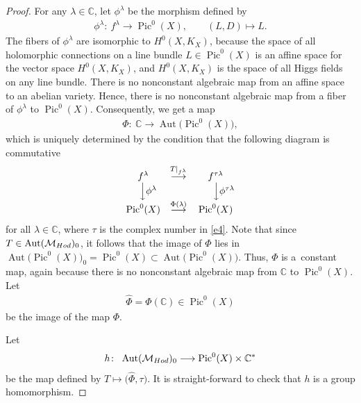 \documentclass[11pt]{article}
\numberwithin{equation}{section}
\begin{document}
\begin{proof}
For any $\lambda \in \mathbb C$, let $\phi^\lambda$ be the morphism def\/ined by
\begin{gather}\label{e7}
\phi^\lambda \colon \ f^\lambda \longrightarrow \operatorname{Pic}^0(X) ,\qquad (L, D) \longmapsto L .
\end{gather}
The f\/ibers of $\phi^\lambda$ are isomorphic to $H^0(X, K_X)$, because the space of all holomorphic connections on a line bundle $L \in \operatorname{Pic}^0(X)$ is an af\/f\/ine space for the vector space $H^0(X, K_X)$, and $H^0(X, K_X)$ is the space of all Higgs f\/ields on any line bundle. There is no nonconstant algebraic map from an af\/f\/ine space to an abelian variety. Hence, there is no nonconstant algebraic map from a f\/iber of $\phi^\lambda$ to $\operatorname{Pic}^0(X)$. Consequently, we get a map
\begin{gather*}
\Phi \colon \  {\mathbb C} \longrightarrow \operatorname{Aut}\big(\operatorname{Pic}^0(X)\big),
\end{gather*}
which is uniquely determined by the condition that the following diagram is commutative
\begin{gather*}
\begin{matrix}
f^\lambda & \stackrel{T\vert_{f^\lambda}}{\longrightarrow} & f^{\tau\lambda}\\
~ ~~ \Big\downarrow \phi^\lambda && ~ ~~~~ \Big\downarrow \phi^{\tau\lambda}\\
\operatorname{Pic}^0(X) & \stackrel{\Phi(\lambda)}{\longrightarrow} &\operatorname{Pic}^0(X)
\end{matrix}
\end{gather*}
for all $\lambda \in \mathbb C$, where $\tau$ is the complex number in \eqref{e4}$ $. Note that since $T \in \operatorname{Aut}({\mathcal M}_{\rm Hod})_0$, it follows that the image of $\Phi$ lies in $\operatorname{Aut}\big(\operatorname{Pic}^0(X)\big)_0 = \operatorname{Pic}^0(X) \subset \operatorname{Aut}\big(\operatorname{Pic}^0(X)\big)$. Thus, $\Phi$ is a~constant map, again because there is no nonconstant algebraic map from $\mathbb C$ to $\operatorname{Pic}^0(X)$. Let{\samepage
\begin{gather}\label{e5}
\widehat{\Phi} = \Phi({\mathbb C}) \in \operatorname{Pic}^0(X)
\end{gather}
be the image of the map $\Phi$.}

Let
\begin{gather*}
h \colon \ \operatorname{Aut}({\mathcal M}_{\rm Hod})_0 \longrightarrow \operatorname{Pic}^0(X)\times {\mathbb C}^*
\end{gather*}
be the map def\/ined by $T \longmapsto \big(\widehat{\Phi}, \tau\big)$. It is straight-forward to check that $h$ is a group homomorphism.


\end{proof}
\end{document}
